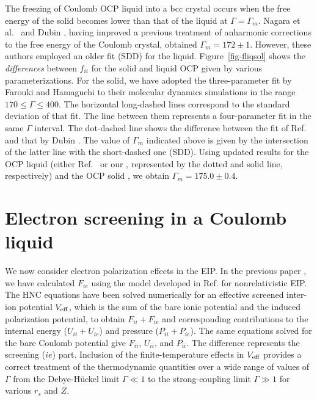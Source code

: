 The freezing of Coulomb OCP liquid 
into a bcc crystal occurs 
when the free energy of the solid becomes 
lower than that of the liquid at $\Gamma=\Gamma_m$.
Nagara et al.\ \cite{NNN} and Dubin \cite{Dubin},
having improved a previous treatment of 
anharmonic corrections to the free energy of the Coulomb crystal,
obtained $\Gamma_m=172\pm1$.
However, these authors employed
an older fit \cite{SDD} (SDD) for the liquid. 
Figure~\ref{fig-fliqsol} shows the {\em differences}
between $f_{ii}$ for the solid and liquid OCP
given by various parameterizations.
For the solid, we have adopted 
the three-parameter fit by Farouki and Hamaguchi \cite{FH}
to their molecular dynamics simulations in the range
$170\leq\Gamma\leq400$.
The horizontal long-dashed lines correspond to
the standard deviation of that fit. 
The line between them represents a four-parameter fit \cite{FH}
in the same $\Gamma$ interval.
The dot-dashed line shows the difference between the fit 
of Ref.\cite{FH} and that by Dubin \cite{Dubin}.
The value of $\Gamma_m$ indicated above
is given by the intersection of the latter line with
the short-dashed one (SDD).
Using updated results for the OCP liquid
(either Ref.~\protect\cite{DWS} or our , 
represented by the dotted and solid line, respectively)
and the OCP solid \cite{FH}, we obtain $\Gamma_m=175.0\pm0.4$.

\section{Electron screening in a Coulomb liquid}
\label{sect-ie}
%
We now consider electron polarization effects in the EIP.
In the previous paper \cite{CP98}, we have calculated
$F_{ie}$ using the model developed in Ref.\cite{C90}
for nonrelativistic EIP.
The HNC equations have been
solved numerically for an
effective screened inter-ion potential $V_{\rm eff}$,
which is the sum of the bare ionic potential 
and the induced polarization
potential, to obtain $F_{ii} + F_{ie}$ and corresponding contributions
to the internal energy ($U_{ii} + U_{ie}$) 
and pressure ($P_{ii} + P_{ie}$).
The same equations solved for the bare Coulomb potential
give $F_{ii}$, $U_{ii}$, and $P_{ii}$.
The difference represents the screening ($ie$) part.
Inclusion of the finite-temperature effects in $V_{\rm eff}$
provides a correct treatment
of the thermodynamic quantities over a wide range of values of $\Gamma$
from the Debye-H\"uckel limit $\Gamma\ll1$
to the strong-coupling limit $\Gamma\gg1$ for various $r_s$ and $Z$.

